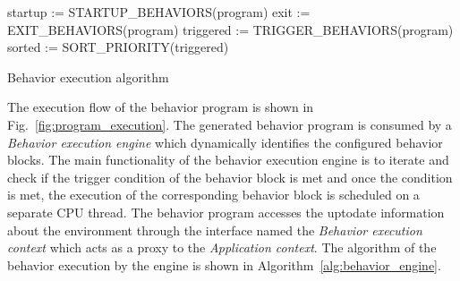 \begin{algorithm}[H]
 startup := STARTUP\_BEHAVIORS(program)\;
 exit := EXIT\_BEHAVIORS(program)\;
 triggered := TRIGGER\_BEHAVIORS(program)\;
 sorted := SORT\_PRIORITY(triggered)\;
 \caption{Behavior execution algorithm}
 \label{alg:behavior_engine}
\end{algorithm}
 The execution flow of the behavior program is shown in Fig.~\ref{fig:program_execution}. The generated behavior program is consumed by a \emph{Behavior execution engine} which dynamically identifies the configured behavior blocks. The main functionality of the behavior execution engine is to iterate and check if the trigger condition of the behavior block is met and once the condition is met, the execution of the corresponding behavior block is scheduled on a separate CPU thread. The behavior program accesses the uptodate information about the environment through the interface named the \emph{Behavior execution context} which acts as a proxy to the \emph{Application context}. The algorithm of the behavior execution by the engine is shown in Algorithm~\ref{alg:behavior_engine}.
